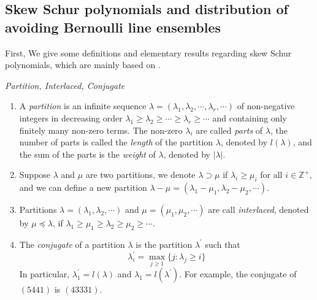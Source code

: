 \subsection{Skew Schur polynomials and distribution of avoiding Bernoulli line ensembles}{\label{SkewSchurPoly}}
First, We give some definitions and elementary results regarding skew Schur polynomials, which are mainly based on \cite[Chapter 1]{Mac}.
\begin{definition}{\label{DefPar}} \emph{Partition, Interlaced, Conjugate}
\begin{enumerate}
	\item A \emph{partition} is an infinite sequence $\lambda=(\lambda_{1}, \lambda_{2}, \cdots, \lambda_{r}, \cdots)$ of non-negative integers in decreasing order $\lambda_{1}\geq \lambda_{2}\geq \cdots\geq \lambda_{r}\geq \cdots$ and containing only finitely many non-zero terms. The non-zero $\lambda_{i}$ are called \emph{parts} of $\lambda$, the number of parts is called the \emph{length} of the partition $\lambda$, denoted by $l(\lambda)$, and the sum of the parts is the \emph{weight} of $\lambda$, denoted by $|\lambda|$.
	\item Suppose $\lambda$ and $\mu$ are two partitions, we denote $\lambda\supset\mu$ if $\lambda_{i}\geq \mu_{i}$ for all $i\in \mathbb{Z}^{+}$, and we can define a new partition $\lambda-\mu=(\lambda_{1}-\mu_{1},\lambda_{2}-\mu_{2},\cdots)$.
	\item Partitions $\lambda=(\lambda_{1}, \lambda_{2},\cdots)$ and $\mu=(\mu_{1}, \mu_{2},\cdots)$ are call \emph{interlaced}, denoted by $\mu\preceq \lambda$, if $\lambda_1\geq \mu_1\geq \lambda_2\geq \mu_2\geq\cdots$.
	\item The \emph{conjugate} of a partition $\lambda$ is the partition $\lambda^{\prime}$ such that
	\begin{equation*}
		\lambda^{\prime}_{i}=\max_{j\geq 1}\{j:\lambda_{j}\geq i\}
	\end{equation*}
	In particular, $\lambda_{1}^{\prime}=l(\lambda)$ and $\lambda_{1}=l(\lambda^{\prime})$. For example, the conjugate of $(5441)$ is $(43331)$.
\end{enumerate}
\end{definition}

